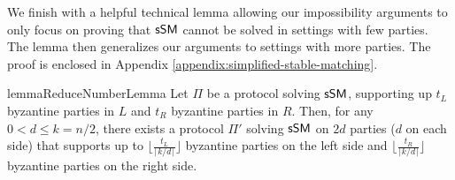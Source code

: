 We finish with a helpful technical lemma
allowing our impossibility arguments to only focus on proving that $\textsf{sSM}$ cannot be solved in settings with few parties. The lemma then generalizes our arguments to settings with more parties. The proof is enclosed in Appendix \ref{appendix:simplified-stable-matching}.
\begin{restatable}{lemma}{ReduceNumberLemma}\label{lemma:reduce-number}
Let $\Pi$ be a protocol solving $\textsf{sSM}$, supporting up $t_L$ byzantine parties in $L$ and $t_R$ byzantine parties in $R$. Then, for any $0 < d \leq k = n/2$, there exists a protocol $\Pi'$ solving $\textsf{sSM}$ on $2d$ parties ($d$ on each side) that supports up to $\lfloor \frac{t_L}{\lceil k / d \rceil} \rfloor$ byzantine parties on the left side and $\lfloor \frac{t_R}{\lceil k / d \rceil} \rfloor$ byzantine parties on the right side.
\end{restatable}
